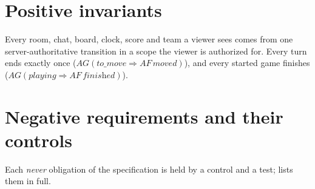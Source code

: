\documentclass[11pt,oneside]{book}
\begin{document}
\section{Positive invariants}
Every room, chat, board, clock, score and team a viewer sees comes from one
server-authoritative transition in a scope the viewer is authorized for. Every
turn ends exactly once (\(AG(\textit{to\_move} \Rightarrow AF\,\textit{moved})\)),
and every started game finishes (\(AG(\textit{playing} \Rightarrow AF\,\textit{finished})\)).

\section{Negative requirements and their controls}
Each \emph{never} obligation of the specification is held by a control and a
test;  lists them in full.
\end{document}
